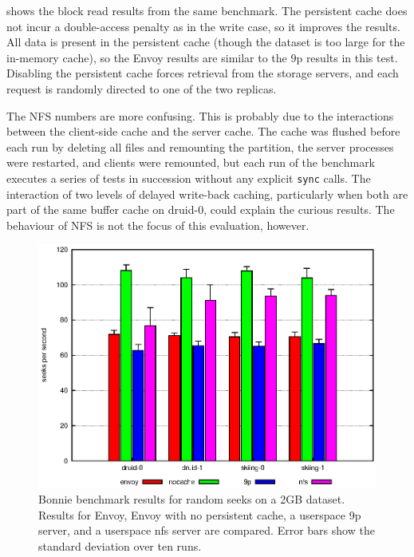  shows the block read results from the same benchmark. The persistent cache does not incur a double-access penalty as in the write case, so it improves the results. All data is present in the persistent cache (though the dataset is too large for the in-memory cache), so the Envoy results are similar to the 9p results in this test. Disabling the persistent cache forces retrieval from the storage servers, and each request is randomly directed to one of the two replicas.

The NFS numbers are more confusing. This is probably due to the interactions between the client-side cache and the server cache. The cache was flushed before each run by deleting all files and remounting the partition, the server processes were restarted, and clients were remounted, but each run of the benchmark executes a series of tests in succession without any explicit \texttt{sync} calls. The interaction of two levels of delayed write-back caching, particularly when both are part of the same buffer cache on druid-0, could explain the curious results. The behaviour of NFS is not the focus of this evaluation, however.

\begin{figure}[t]
\centering
\includegraphics[width=\figwidth]{figures/bonnie-seek}
\caption[Bonnie benchmark results for random seeks]{Bonnie benchmark results for random seeks on a 2GB dataset. Results for Envoy, Envoy with no persistent cache, a userspace 9p server, and a userspace nfs server are compared. Error bars show the standard deviation over ten runs.}
\label{fig:bonnie-seek}
\end{figure}


